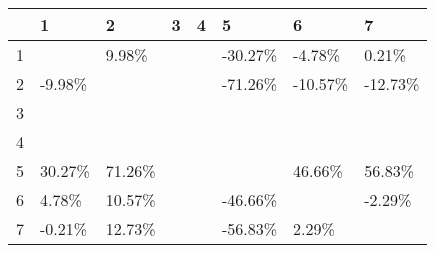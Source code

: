 \begin{table}[ht]
\centering
\begin{tabular}{rlllllll}
  \hline
 & 1 & 2 & 3 & 4 & 5 & 6 & 7 \\ 
  \hline
1 &  & 9.98\% &  &  & -30.27\% & -4.78\% & 0.21\% \\ 
  2 & -9.98\% &  &  &  & -71.26\% & -10.57\% & -12.73\% \\ 
  3 &  &  &  &  &  &  &  \\ 
  4 &  &  &  &  &  &  &  \\ 
  5 & 30.27\% & 71.26\% &  &  &  & 46.66\% & 56.83\% \\ 
  6 & 4.78\% & 10.57\% &  &  & -46.66\% &  & -2.29\% \\ 
  7 & -0.21\% & 12.73\% &  &  & -56.83\% & 2.29\% &  \\ 
   \hline
\end{tabular}
\end{table}
